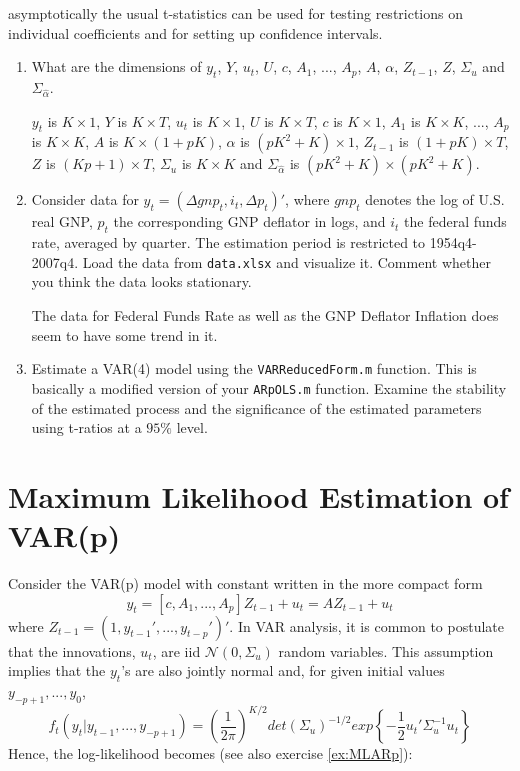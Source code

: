 \documentclass[a4paper]{scrartcl}
\begin{document}
asymptotically the usual t-statistics can be used for testing restrictions on individual coefficients and for setting up confidence intervals.
\begin{enumerate}
	\item What are the dimensions of $y_t$, $Y$, $u_t$, $U$, $c$, $A_1$, ..., $A_p$, $A$, $\alpha$, $Z_{t-1}$, $Z$, $\Sigma_u$ and $\Sigma_{\hat{\alpha}}$.
	\begin{solution}		
		$y_t$ is $K \times 1$, $Y$ is $K \times T$, $u_t$ is $K \times 1$, $U$ is $K \times T$, $c$ is $K \times 1$, $A_1$ is $K \times K$, ..., $A_p$ is $K \times K$, $A$ is $K \times (1+pK)$, $\alpha$ is $(pK^2+K) \times 1$, $Z_{t-1}$ is $(1+pK) \times T$, $Z$ is $(Kp+1) \times T$, $\Sigma_u$ is $K \times K$ and $\Sigma_{\hat{\alpha}}$ is $(pK^2+K) \times (pK^2+K)$.
	\end{solution}
	\item Consider data for $y_t = (\Delta gnp_t,i_t,\Delta p_t)'$, where $gnp_t$ denotes the log of U.S. real GNP, $p_t$ the corresponding GNP deflator in logs, and $i_t$ the federal funds rate, averaged by quarter. The estimation period is restricted to 1954q4-2007q4. Load the data from  \texttt{data.xlsx} and visualize it. Comment whether you think the data looks stationary.
	\begin{solution}
		The data for Federal Funds Rate as well as the GNP Deflator Inflation does seem to have some trend in it.
	\end{solution}
	\item Estimate a VAR(4) model using the \texttt{VARReducedForm.m} function. This is basically a modified version of your \texttt{ARpOLS.m} function. Examine the stability of the estimated process and the significance of the estimated parameters using t-ratios at a $95\%$ level.
	\begin{solution}
		
	\end{solution}
\end{enumerate}

\section{Maximum Likelihood Estimation of VAR(p)}
Consider the VAR(p) model with constant written in the more compact form
$$ y_t = [c, A_1, ..., A_p] Z_{t-1} + u_t = A Z_{t-1}+ u_t$$
where $Z_{t-1}=(1,y_{t-1}',...,y_{t-p}')'$. In VAR analysis, it is common to postulate that the innovations, $u_t$, are iid $\mathcal{N}(0,\Sigma_u)$ random variables. This assumption implies that the $y_t$'s are also jointly normal and, for given initial values $y_{-p+1},...,y_{0}$,
$$f_t(y_t|y_{t-1},...,y_{-p+1})=\left(\frac{1}{2\pi}\right)^{K/2} det(\Sigma_u)^{-1/2}exp\left\{-\frac{1}{2}u_t'\Sigma_u^{-1}u_t\right\}$$ 
Hence, the log-likelihood becomes (see also exercise \ref{ex:MLARp}):
\end{document}
